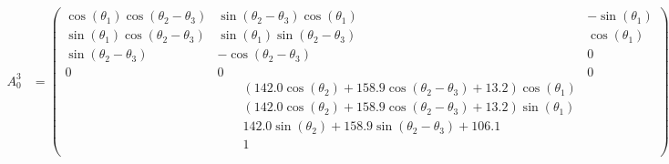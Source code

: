 \documentclass[a4paper,12pt]{article}
\begin{document}
{\footnotesize\begin{align*}
    A_0^3 & =
    \begin{pmatrix}
        \cos{\left(\theta_{1} \right)} \cos{\left(\theta_{2} - \theta_{3} \right)} & \sin{\left(\theta_{2} - \theta_{3} \right)} \cos{\left(\theta_{1} \right)}                                                                         & - \sin{\left(\theta_{1} \right)} \\
        \sin{\left(\theta_{1} \right)} \cos{\left(\theta_{2} - \theta_{3} \right)} & \sin{\left(\theta_{1} \right)} \sin{\left(\theta_{2} - \theta_{3} \right)}                                                                         & \cos{\left(\theta_{1} \right)}   \\
        \sin{\left(\theta_{2} - \theta_{3} \right)}                                & - \cos{\left(\theta_{2} - \theta_{3} \right)}                                                                                                      & 0                                \\
        0                                                                          & 0                                                                                                                                                  & 0                                \\
                                                                                   & \qquad \left(142.0 \cos{\left(\theta_{2} \right)} + 158.9 \cos{\left(\theta_{2} - \theta_{3} \right)} + 13.2\right) \cos{\left(\theta_{1} \right)}                                    \\
                                                                                   & \qquad \left(142.0 \cos{\left(\theta_{2} \right)} + 158.9 \cos{\left(\theta_{2} - \theta_{3} \right)} + 13.2\right) \sin{\left(\theta_{1} \right)}                                    \\
                                                                                   & \qquad 142.0 \sin{\left(\theta_{2} \right)} + 158.9 \sin{\left(\theta_{2} - \theta_{3} \right)} + 106.1                                                                               \\
                                                                                   & \qquad 1                                                                                                                                                                              \\
    \end{pmatrix}
\end{align*}}
\end{document}
